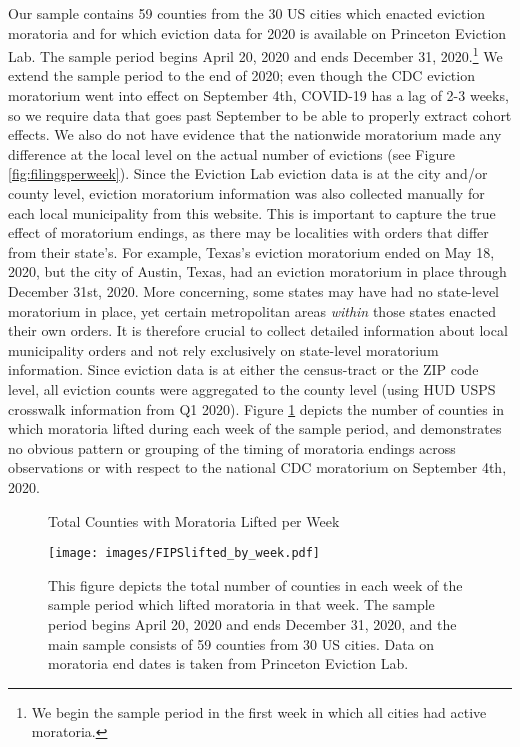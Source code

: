 \documentclass[12pt]{amsart}
\begin{document}
Our sample contains 59 counties from the 30 US cities which enacted eviction moratoria and for which eviction data for 2020 is available on Princeton Eviction Lab. The sample period begins April 20, 2020 and ends December 31, 2020.\footnote{We begin the sample period in the first week in which all cities had active moratoria.} We extend the sample period to the end of 2020; even though the CDC eviction moratorium went into effect on September 4th, COVID-19 has a lag of 2-3 weeks, so we require data that goes past September to be able to properly extract cohort effects. We also do not have evidence that the nationwide moratorium made any difference at the local level on the actual number of evictions (see Figure \ref{fig:filingsperweek}). Since the Eviction Lab eviction data is at the city and/or county level, eviction moratorium information was also collected manually for each local municipality from this website. This is important to capture the true effect of moratorium endings, as there may be localities with orders that differ from their state's. For example, Texas's eviction moratorium ended on May 18, 2020, but the city of Austin, Texas, had an eviction moratorium in place through December 31st, 2020.  More concerning, some states may have had no state-level moratorium in place, yet certain metropolitan areas \textit{within} those states enacted their own orders. It is therefore crucial to collect detailed information about local municipality orders and not rely exclusively on state-level moratorium information. Since eviction data is at either the census-tract or the ZIP code level, all eviction counts were aggregated to the county level (using HUD USPS crosswalk information from Q1 2020). Figure \ref{fig:liftingsbyweek} depicts the number of counties in which moratoria lifted during each week of the sample period, and demonstrates no obvious pattern or grouping of the timing of moratoria endings across observations or with respect to the national CDC moratorium on September 4th, 2020. 

\begin{figure}[H]
    \caption{Total Counties with Moratoria Lifted per Week}
    \centering     %
    \texttt{[image: images/FIPSlifted\_by\_week.pdf]}
    \caption*{This figure depicts the total number of counties in each week of the sample period which lifted moratoria in that week. The sample period begins April 20, 2020 and ends December 31, 2020, and the main sample consists of 59 counties from 30 US cities. Data on moratoria end dates is taken from Princeton Eviction Lab.}
    \label{fig:liftingsbyweek}
\end{figure}
\end{document}
